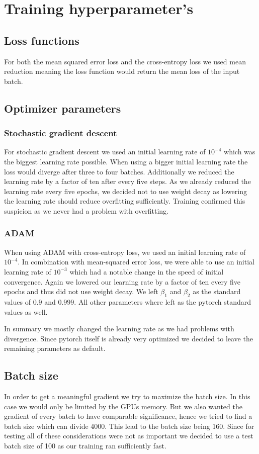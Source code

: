 \vspace{3 em}
\section{Training hyperparameter's}
\subsection{Loss functions}

For both the mean squared error loss and the cross-entropy loss we used mean reduction meaning the loss function would return the mean loss of the input batch.

\subsection{Optimizer parameters}
\subsubsection{Stochastic gradient descent}
For stochastic gradient descent we used an initial learning rate of $10^{-4}$ which was the biggest learning rate possible. 
When using a bigger initial learning rate the loss would diverge after three to four batches. Additionally we reduced the learning rate by a factor of ten after every five steps.
As we already reduced the learning rate every five epochs, we decided not to use weight decay as lowering the learning rate should reduce overfitting sufficiently.
Training confirmed this suspicion as we never had a problem with overfitting.

\subsubsection{ADAM}
When using ADAM with cross-entropy loss, we used an initial learning rate of $10^{-4}$. In combination with mean-squared error loss, we were able to use an initial learning rate of $10^{-3}$ which had a notable change in the speed of initial convergence.
Again we lowered our learning rate by a factor of ten every five epochs and thus did not use weight decay. We left $\beta_1$ and $\beta_2$ as the standard values of $0.9$ and $0.999$. All other parameters where left as the pytorch standard values as well.


In summary we mostly changed the learning rate as we had problems with divergence. Since pytorch itself is already very optimized we decided to leave the remaining parameters as default.

\subsection{Batch size}
In order to get a meaningful gradient we try to maximize the batch size. 
In this case we would only be limited by the GPUs memory.
But we also wanted the gradient of every batch to have comparable significance, hence we tried to find a batch size which can divide 4000.
This lead to the batch size being 160. Since for testing all of these considerations were not as important we decided to use a test batch size of 100 as our training ran sufficiently fast.

